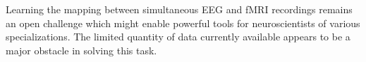 \documentclass{article}
\begin{document}
Learning the mapping between simultaneous EEG and fMRI recordings remains an open challenge which might enable powerful tools for neuroscientists of various specializations. The limited quantity of data currently available appears to be a major obstacle in solving this task.



\end{document}
